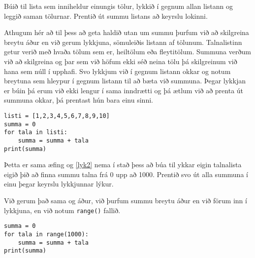 \begin{exercise}\label{lyk2}
Búið til lista sem inniheldur einungis tölur, lykkið í gegnum allan listann og leggið saman tölurnar.
Prentið út summu listans að keyrslu lokinni.
\end{exercise}
\begin{Answer}[ref={lyk2}]
Athugum hér að til þess að geta haldið utan um summu þurfum við að skilgreina breytu áður en við gerum lykkjuna, sömuleiðis listann af tölunum.
Talnalistinn getur verið með hvaða tölum sem er, heiltölum eða fleytitölum.
Summuna verðum við að skilgreina og þar sem við höfum ekki séð neina tölu þá skilgreinum við hana sem núll í upphafi.
Svo lykkjum við í gegnum listann okkar og notum breytuna sem hleypur í gegnum listann til að bæta við summuna.
Þegar lykkjan er búin þá erum við ekki lengur í sama inndrætti og þá ætlum við að prenta út summuna okkar, þá prentast hún bara einu sinni.
 
\begin{lstlisting}
listi = [1,2,3,4,5,6,7,8,9,10]
summa = 0
for tala in listi:
	summa = summa + tala
print(summa)\end{lstlisting}
\end{Answer}

\begin{exercise}\label{lyk3}
Þetta er sama æfing og \ref{lyk2} nema í stað þess að búa til ykkar eigin talnalista eigið þið að finna summu talna frá 0 upp að 1000.
Prentið svo út alla summuna í einu þegar keyrslu lykkjunnar lýkur.
\end{exercise}
\begin{Answer}[ref={lyk3}]
Við gerum það sama og áður, við þurfum summu breytu áður en við förum inn í lykkjuna, en við notum \texttt{range()} fallið.
	
\begin{lstlisting}
summa = 0
for tala in range(1000):
	summa = summa + tala
print(summa)\end{lstlisting}
\end{Answer}


